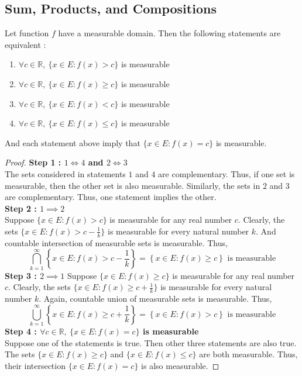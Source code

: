\subsection{Sum, Products, and Compositions}
\begin{theorem}
	Let function $f$ have a measurable domain.
	Then the following statements are equivalent :
	\begin{enumerate}
		\item $\forall c \in \mathbb{R},\ \{ x \in E : f(x) > c\}$ is measurable
		\item $\forall c \in \mathbb{R},\ \{ x \in E : f(x) \ge c\}$ is measurable
		\item $\forall c \in \mathbb{R},\ \{ x \in E : f(x) < c\}$ is measurable
		\item $\forall c \in \mathbb{R},\ \{ x \in E : f(x) \le c\}$ is measurable
	\end{enumerate}
	And each statement above imply that $\{ x \in E : f(x) = c \}$ is measurable.
\end{theorem}
\begin{proof}
	\textbf{Step 1 : $1 \iff 4$ and $2 \iff 3$}\\
	The sets considered in statements $1$ and $4$ are complementary.
	Thus, if one set is measurable, then the other set is also measurable.
	Similarly, the sets in $2$ and $3$ are complementary.
	Thus, one statement implies the other.\\

	\textbf{Step 2 : $1 \implies 2$}\\
	Suppose $\{ x \in E : f(x) > c \}$ is measurable for any real number $c$.
	Clearly, the sets $\{ x \in E : f(x) > c-\frac{1}{k} \}$ is measurable for every natural number $k$.
	And countable intersection of measurable sets is measurable.
	Thus,
	$$\displaystyle \bigcap_{k=1}^\infty \left\{ x \in E : f(x) > c-\frac{1}{k} \right\} = \left\{ x \in E : f(x) \ge c \right\} \text{ is measurable}$$
	\textbf{Step 3 : $2 \implies 1$}
	Suppose $\{ x \in E : f(x) \ge c \}$ is measurable for any real number $c$.
	Clearly, the sets $\{ x \in E : f(x) \ge c+\frac{1}{k} \}$ is measurable for every natural number $k$.
	Again, countable union of measurable sets is measurable. Thus,
	$$\displaystyle \bigcup_{k=1}^\infty \left\{ x \in E : f(x) \ge c+\frac{1}{k} \right\} = \left\{ x \in E : f(x) > c \right\} \text{ is measurable}$$
	\textbf{Step 4 : $\forall c \in \mathbb{R},\ \{ x \in E : f(x) =c \}$ is measurable}\\
	Suppose one of the statements is true.
	Then other three statements are also true.
	The sets $\{ x \in E : f(x) \ge c \}$ and $\{ x \in E : f(x) \le c \}$ are both measurable.
	Thus, their intersection $\{ x \in E : f(x) = c \}$ is also measurable.
\end{proof}

